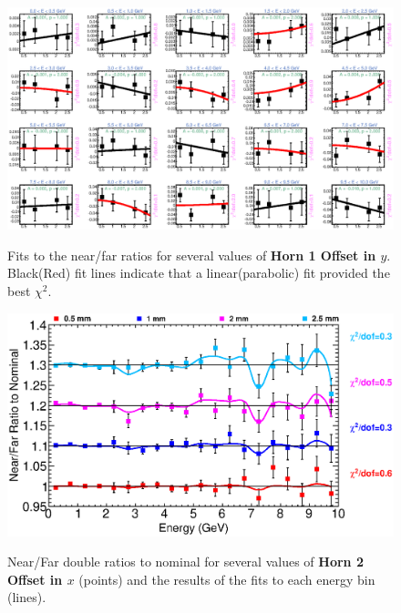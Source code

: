 \begin{figure}[ht]
  \begin{center}
    {\includegraphics[width=5.0in]{figures/Horn1YOffset_nof_fits.eps}}
  \end{center}
\caption{ Fits to the near/far ratios for several values of {\bf Horn 1 Offset in $y$}. Black(Red) fit lines indicate that a linear(parabolic) fit provided the best $\chi^2$. }
\end{figure}

\begin{figure}[ht]
  \begin{center}
    {\includegraphics[width=6.0in]{figures/Horn2XOffset_nof_summary.eps}}
  \end{center}
\caption{ Near/Far double ratios to nominal for several values of {\bf Horn 2 Offset in $x$} (points) and the results of the fits to each energy bin (lines).}
\end{figure}

